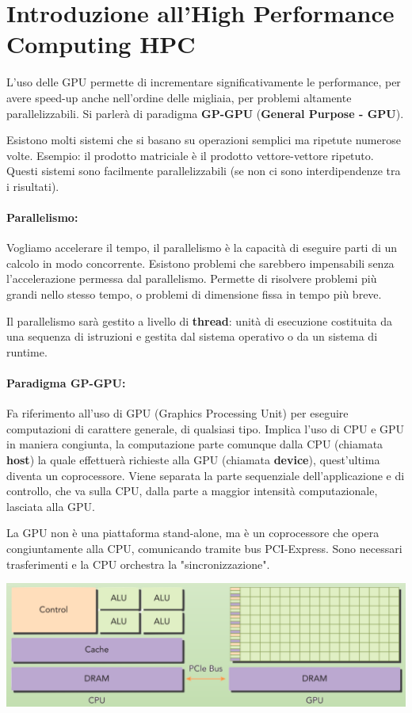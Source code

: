 \section{Introduzione all'High Performance Computing HPC}

L'uso delle GPU permette di incrementare significativamente le performance, per avere speed-up anche nell'ordine delle migliaia, per problemi altamente parallelizzabili. Si parlerà di paradigma \textbf{GP-GPU} (\textbf{General Purpose - GPU}).

Esistono molti sistemi che si basano su operazioni semplici ma ripetute numerose volte. Esempio: il prodotto matriciale è il prodotto vettore-vettore ripetuto. Questi sistemi sono facilmente parallelizzabili (se non ci sono interdipendenze tra i risultati).

\paragraph{Parallelismo:} Vogliamo accelerare il tempo, il parallelismo è la capacità di eseguire parti di un calcolo in modo concorrente. Esistono problemi che sarebbero impensabili senza l'accelerazione permessa dal parallelismo. Permette di risolvere problemi più grandi nello stesso tempo, o problemi di dimensione fissa in tempo più breve.

Il parallelismo sarà gestito a livello di \textbf{thread}: unità di esecuzione costituita da una sequenza di istruzioni e gestita dal sistema operativo o da un sistema di runtime.

\paragraph{Paradigma GP-GPU:} Fa riferimento all'uso di GPU (Graphics Processing Unit) per eseguire computazioni di carattere generale, di qualsiasi tipo. Implica l'uso di CPU e GPU in maniera congiunta, la computazione parte comunque dalla CPU (chiamata \textbf{host}) la quale effettuerà richieste alla GPU (chiamata \textbf{device}), quest'ultima diventa un coprocessore. Viene separata la parte sequenziale dell'applicazione e di controllo, che va sulla CPU, dalla parte a maggior intensità computazionale, lasciata alla GPU.

La GPU non è una piattaforma stand-alone, ma è un coprocessore che opera congiuntamente alla CPU, comunicando tramite bus PCI-Express. Sono necessari trasferimenti e la CPU orchestra la "sincronizzazione".
\begin{center}
	\includegraphics[width=0.95\linewidth]{img/intro/gpgpu1}
\end{center}

